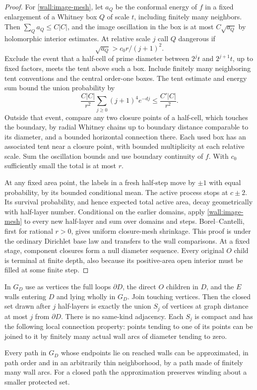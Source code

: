 \begin{proof}
For \eqref{wall:image-mesh}, let $a_Q$ be the conformal energy of $f$ in a fixed enlargement of a Whitney box $Q$ of scale $t$, including finitely many neighbors.  Then $\sum_Qa_Q\le C|C|$, and the image oscillation in the box is at most $C\sqrt{a_Q}$ by holomorphic interior estimates.  At relative scale $j$ call $Q$ dangerous if
\[
\sqrt{a_Q}>c_0r/(j+1)^2.
\]
Exclude the event that a half-cell of prime diameter between $2^jt$ and $2^{j+1}t$, up to fixed factors, meets the tent above such a box.  Include finitely many neighboring tent conventions and the central order-one boxes.  The tent estimate and energy sum bound the union probability by
\[
\frac{C|C|}{r^2}\sum_{j\ge0}(j+1)^4e^{-dj}\le \frac{C'|C|}{r^2}.
\]
Outside that event, compare any two closure points of a half-cell, which touches the boundary, by radial Whitney chains up to boundary distance comparable to its diameter, and a bounded horizontal connection there.  Each used box has an associated tent near a closure point, with bounded multiplicity at each relative scale.  Sum the oscillation bounds and use boundary continuity of $f$.  With $c_0$ sufficiently small the total is at most $r$.

At any fixed area point, the labels in a fresh half-step move by $\pm1$ with equal probability, by its bounded conditional mean.  The active process stops at $c\pm2$.  Its survival probability, and hence expected total active area, decay geometrically with half-layer number.  Conditional on the earlier domains, apply \eqref{wall:image-mesh} to every new half-layer and sum over domains and steps.  Borel--Cantelli, first for rational $r>0$, gives uniform closure-mesh shrinkage.  This proof is under the ordinary Dirichlet base law and transfers to the wall comparisons.  At a fixed stage, component closures form a null diameter sequence.  Every original $O$ child is terminal at finite depth, also because its positive-area open interior must be filled at some finite step.
\end{proof}

\begin{lemma}\label{wall:graph}
In $G_D$ use as vertices the full loops $\partial D$, the direct $O$ children in $D$, and the $E$ walls entering $D$ and lying wholly in $G_D$.  Join touching vertices.  Then the closed set drawn after $j$ half-layers is exactly the union $S_j$ of vertices at graph distance at most $j$ from $\partial D$.  There is no same-kind adjacency.  Each $S_j$ is compact and has the following local connection property: points tending to one of its points can be joined to it by finitely many actual wall arcs of diameter tending to zero.

Every path in $G_D$ whose endpoints lie on reached walls can be approximated, in path order and in an arbitrarily thin neighborhood, by a path made of finitely many wall arcs.  For a closed path the approximation preserves winding about a smaller protected set.
\end{lemma}

